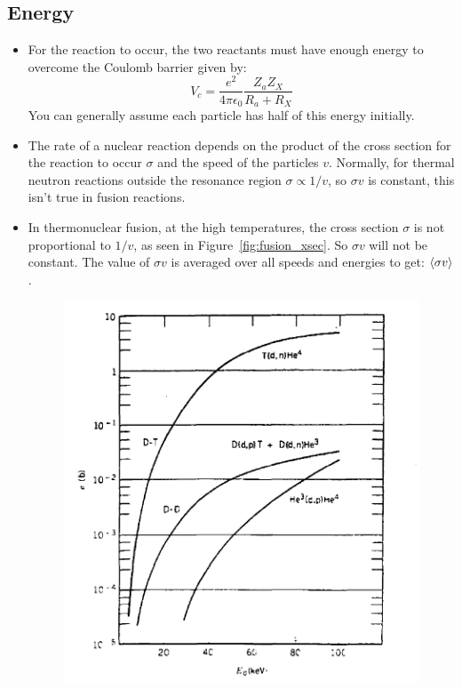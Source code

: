 \documentclass[letter]{article}
\begin{document}
\subsection{Energy}
\begin{itemize}
\item For the reaction to occur, the two reactants must have enough
  energy to overcome the Coulomb barrier given by:
  \begin{equation*}
    V_c = \frac{e^2}{4\pi\epsilon_0}\frac{Z_aZ_X}{R_a+R_X}
  \end{equation*}
You can generally assume each particle has half of this energy initially.
\item The rate of a nuclear reaction depends on the product of the
  cross section for the reaction to occur $\sigma$ and the speed of
  the particles $v$. Normally, for thermal neutron reactions outside the
  resonance region $\sigma \propto 1/v$, so $\sigma{}v$ is
  constant, this isn't true in fusion reactions.~\cite[pp. 532]{krane}
\item In thermonuclear fusion, at the high temperatures, the cross
  section $\sigma$ is not proportional to $1/v$, as seen in
  Figure~\ref{fig:fusion_xsec}. So $\sigma{}v$ will not be constant. The value of
  $\sigma{}v$ is averaged over all speeds and energies to get:
  $\braket{\sigma{}v}$.~\cite[pp. 533]{krane}
  \begin{figure}[hbtp]
    \centering
    \includegraphics[scale=0.5]{images/fusion_xsection}

\end{figure}
\end{itemize}
\end{document}
